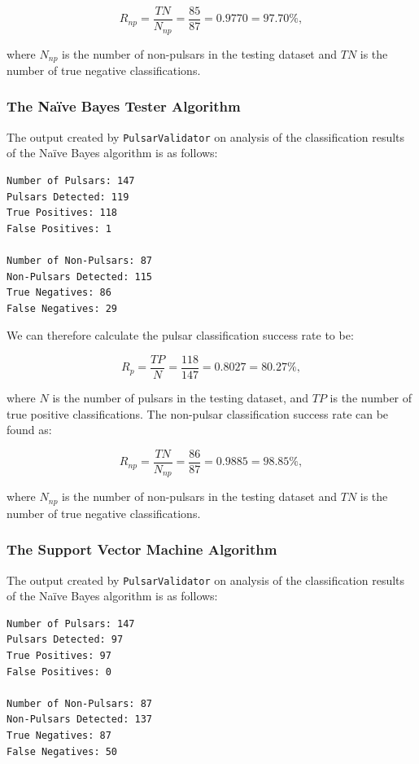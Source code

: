 \documentclass{article}
\begin{document}
$$R_{np} = \frac{TN}{N_{np}} = \frac{85}{87} = 0.9770 = 97.70\%,$$

where $N_{np}$ is the number of non-pulsars in the testing dataset and $TN$ is the number of true negative classifications.

\subsubsection{The Naïve Bayes Tester Algorithm}

The output created by \verb|PulsarValidator| on analysis of the classification results of the Naïve Bayes algorithm is as follows:

\begin{lstlisting}[numbers=none]
Number of Pulsars: 147
Pulsars Detected: 119
True Positives: 118
False Positives: 1

Number of Non-Pulsars: 87
Non-Pulsars Detected: 115
True Negatives: 86
False Negatives: 29
\end{lstlisting}

We can therefore calculate the pulsar classification success rate to be:

$$ R_{p} = \frac{TP}{N} = \frac{118}{147} =  0.8027 = 80.27\%,$$

where $N$ is the number of pulsars in the testing dataset, and $TP$ is the number of true positive classifications. The non-pulsar classification success rate can be found as:

$$R_{np} = \frac{TN}{N_{np}} = \frac{86}{87} = 0.9885 = 98.85\%,$$

where $N_{np}$ is the number of non-pulsars in the testing dataset and $TN$ is the number of true negative classifications.

\subsubsection{The Support Vector Machine Algorithm}

The output created by \verb|PulsarValidator| on analysis of the classification results of the Naïve Bayes algorithm is as follows:

\begin{lstlisting}[numbers=none]
Number of Pulsars: 147
Pulsars Detected: 97
True Positives: 97
False Positives: 0

Number of Non-Pulsars: 87
Non-Pulsars Detected: 137
True Negatives: 87
False Negatives: 50
\end{lstlisting}
\end{document}
